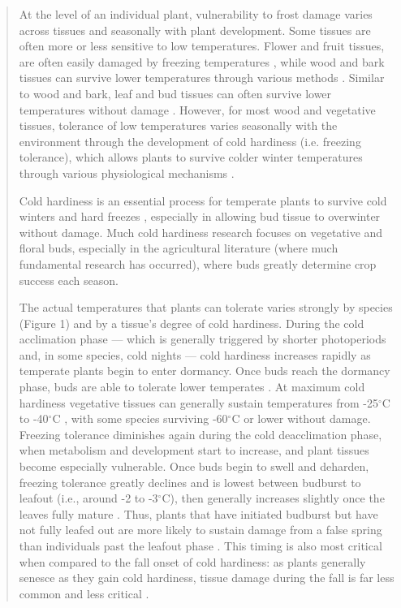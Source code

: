\documentclass[11pt,a4paper]{article}
\begin{document}
\begin{quotation}
At the level of an individual plant, vulnerability to frost damage varies across tissues and seasonally with plant development. Some tissues are often more or less sensitive to low temperatures. Flower and fruit tissues, are often easily damaged by freezing temperatures \citep{Augspurger2009, Caradonna2016, Inouye2000, Lenz2013}, while wood and bark tissues can survive lower temperatures through various methods \citep{Strimbeck2015}. Similar to wood and bark, leaf and bud tissues can often survive lower temperatures without damage \citep{Charrier2011}. However, for most wood and vegetative tissues, tolerance of low temperatures varies seasonally with the environment through the development of cold hardiness (i.e. freezing tolerance), which allows plants to survive colder winter temperatures through various physiological mechanisms \citep[] [e.g., deep supercooling, increased solute concentration, and an increase in dehydrins and other proteins] {Sakai1987, Strimbeck2015}. 

Cold hardiness is an essential process for temperate plants to survive cold winters and hard freezes \citep{Vitasse2014}, especially in allowing bud tissue to overwinter without damage. Much cold hardiness research focuses on vegetative and floral buds, especially in the agricultural literature (where much fundamental research has occurred), where buds greatly determine crop success each season. 

The actual temperatures that plants can tolerate varies strongly by species (Figure 1) and by a tissue's degree of cold hardiness. During the cold acclimation phase --- which is generally triggered by shorter photoperiods \citep{Howe2003, Charrier2011, Strimbeck2015, Welling1997} and, in some species, cold nights \citep{Charrier2011, Heide2005} --- cold hardiness increases rapidly as temperate plants begin to enter dormancy. Once buds reach the dormancy phase, buds are able to tolerate lower temperates \citep[ to -60$^{\circ}$C in extreme cases,][] {Korner2012}. At maximum cold hardiness vegetative tissues can generally sustain temperatures from -25$^{\circ}$C to -40$^{\circ}$C \citep{Charrier2011,Korner2012,Vitasse2014}, with some species surviving -60$^{\circ}$C or lower without damage. Freezing tolerance diminishes again during the cold deacclimation phase, when metabolism and development start to increase, and plant tissues become especially vulnerable. Once buds begin to swell and deharden, freezing tolerance greatly declines and is lowest between budburst to leafout (i.e., around -2 to -3$^{\circ}$C), then generally increases slightly once the leaves fully mature \citep[] [i.e., around -3 to -5$^{\circ}$C] {Lenz2013}. Thus, plants that have initiated budburst but have not fully leafed out are more likely to sustain damage from a false spring than individuals past the leafout phase \citep{Lenz2016}. This timing is also most critical when compared to the fall onset of cold hardiness: as plants generally senesce as they gain cold hardiness, tissue damage during the fall is far less common and less critical \citep{Estiarte2015, Liu2018}.  


\end{quotation}
\end{document}
